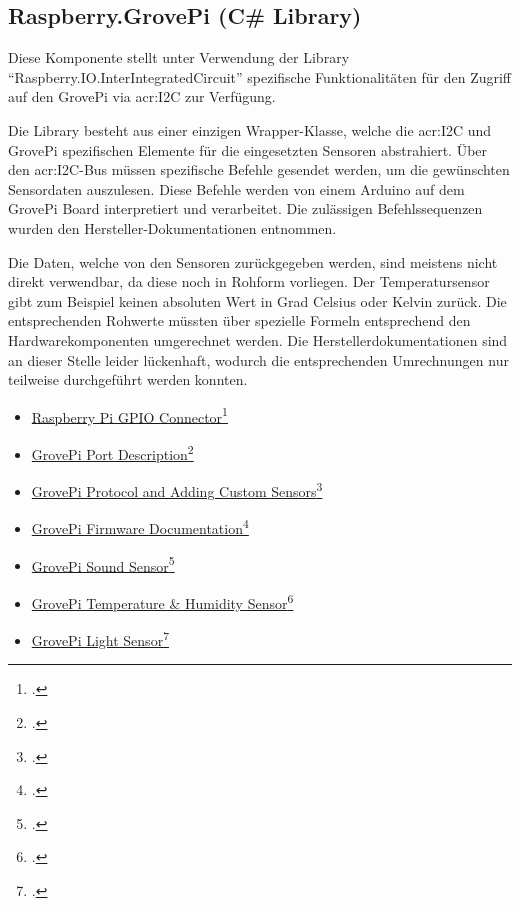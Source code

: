 \subsection{Raspberry.GrovePi (C\# Library)}
Diese Komponente stellt unter Verwendung der Library "`Raspberry.IO.InterIntegratedCircuit"' spezifische Funktionalitäten für den Zugriff auf den GrovePi via \gls{acr:I2C} zur Verfügung.

Die Library besteht aus einer einzigen Wrapper-Klasse, welche die \gls{acr:I2C} und GrovePi spezifischen Elemente für die eingesetzten Sensoren abstrahiert. Über den \gls{acr:I2C}-Bus müssen spezifische Befehle gesendet werden, um die gewünschten Sensordaten auszulesen. Diese Befehle werden von einem Arduino auf dem GrovePi Board interpretiert und verarbeitet. Die zulässigen Befehlssequenzen wurden den Hersteller-Dokumentationen entnommen.

Die Daten, welche von den Sensoren zurückgegeben werden, sind meistens nicht direkt verwendbar, da diese noch in Rohform vorliegen. Der Temperatursensor gibt zum Beispiel keinen absoluten Wert in Grad Celsius oder Kelvin zurück. Die entsprechenden Rohwerte müssten über spezielle Formeln entsprechend den Hardwarekomponenten umgerechnet werden. Die Herstellerdokumentationen sind an dieser Stelle leider lückenhaft, wodurch die entsprechenden Umrechnungen nur teilweise durchgeführt werden konnten.

\begin{itemize}
\item \hyperlink{https://learn.adafruit.com/adafruits-raspberry-pi-lesson-4-gpio-setup/the-gpio-connector}{Raspberry Pi GPIO Connector}\footcite{The_GPIO_Connector_2016-06-19}
\item \hyperlink{http://www.dexterindustries.com/GrovePi/engineering/port-description/}{GrovePi Port Description}\footcite{GrovePi_Port_description_2016-06-19}
\item \hyperlink{http://www.dexterindustries.com/GrovePi/programming/grovepi-protocol-adding-custom-sensors/}{GrovePi Protocol and Adding Custom Sensors}\footcite{GrovePi_Protocol_and_Adding_Custom_Sensors_2016-06-19}
\item \hyperlink{https://github.com/DexterInd/GrovePi/blob/bfcaa57bb6ce2b5c4cb0057569ea38f3574f24cf/Firmware/Source/v1.2/grove_pi_v1_2_6/README.md}{GrovePi Firmware Documentation}\footcite{grovepi_firmware_version_1-2-6_2016-06-19}
\item \hyperlink{http://www.seeedstudio.com/wiki/Grove_-_Sound_Sensor}{GrovePi Sound Sensor}\footcite{Grove_-_Sound_Sensor_-_Wiki_2016-06-19}
\item \hyperlink{http://www.seeedstudio.com/wiki/Grove_-_Temperature_and_Humidity_Sensor}{GrovePi Temperature \& Humidity Sensor}\footcite{Grove_-_Temperature_and_Humidity_Sensor_-_Wiki_2016-06-19}
\item \hyperlink{http://www.seeedstudio.com/wiki/Grove_-_Light_Sensor}{GrovePi Light Sensor}\footcite{Grove_-_Light_Sensor_-_Wiki_2016-06-19}
\end{itemize}


